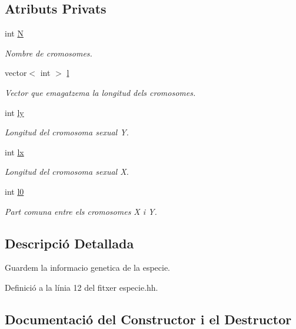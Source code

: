 \subsection*{Atributs Privats}
\begin{DoxyCompactItemize}
\item 
int \hyperlink{classespecie_a3333db40d4af2c0073d50afea08e0296}{N}
\begin{DoxyCompactList}\small\item\em Nombre de cromosomes. \end{DoxyCompactList}\item 
vector$<$ int $>$ \hyperlink{classespecie_a754d7eefb82d1ebe3f573cff16dd43ee}{l}
\begin{DoxyCompactList}\small\item\em Vector que emagatzema la longitud dels cromosomes. \end{DoxyCompactList}\item 
int \hyperlink{classespecie_ad6993a4730779e367c432cce91780895}{ly}
\begin{DoxyCompactList}\small\item\em Longitud del cromosoma sexual Y. \end{DoxyCompactList}\item 
int \hyperlink{classespecie_af620813fbc24dd91e5a25d38b5847bf8}{lx}
\begin{DoxyCompactList}\small\item\em Longitud del cromosoma sexual X. \end{DoxyCompactList}\item 
int \hyperlink{classespecie_a7e4448f0f61a573753aa7000ad073982}{l0}
\begin{DoxyCompactList}\small\item\em Part comuna entre els cromosomes X i Y. \end{DoxyCompactList}\end{DoxyCompactItemize}


\subsection{Descripció Detallada}
Guardem la informacio genetica de la especie. 

Definició a la línia 12 del fitxer especie.\+hh.



\subsection{Documentació del Constructor i el Destructor}
